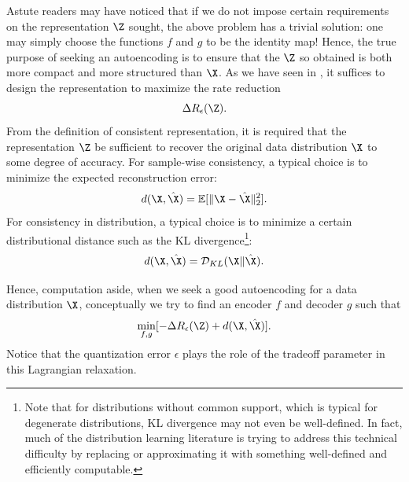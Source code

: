\documentclass[../../book-main.tex]{subfiles}
\begin{document}
Astute readers may have noticed that if we do not impose certain
requirements on the representation $\Z$ sought, the above problem has
a trivial solution: one may simply choose the functions $f$ and $g$
to be the identity map! Hence, the true purpose of seeking an
autoencoding is to ensure that the $\Z$ so obtained is both more
compact and more structured than $\X$.
As we have seen in ,
it suffices to design the representation to maximize the rate reduction
\begin{equation}
  \Delta R_{\epsilon}(\Z).
\end{equation}%
From the definition of consistent representation, it is required that
the representation $\Z$ be sufficient to recover the original data
distribution $\X$ to some degree of accuracy. For sample-wise
consistency, a typical choice is to minimize the expected reconstruction error:
\begin{equation}
  d(\X, \hat \X) = \mathbb{E}[\|\X - \hat\X\|_2^2].
\end{equation}
For consistency in distribution, a typical choice is to minimize a
certain distributional distance such as the KL
divergence\footnote{Note that for distributions without common
  support, which is typical for degenerate distributions, KL divergence
  may not even be well-defined. In fact, much of the distribution
  learning literature is trying to address this technical difficulty by
  replacing or approximating it with something well-defined and
efficiently computable.}:
\begin{equation}
  d(\X, \hat \X) = \mathcal{D}_{KL}(\X\|\hat\X).
\end{equation}

Hence, computation aside, when we seek a good autoencoding for a data
distribution $\X$, conceptually we try to find an encoder $f$ and
decoder $g$ such that
\begin{equation}
  \min_{f, g} [- \Delta R_{\epsilon}(\Z) + d(\X, \hat \X)].
  \label{eqn:autoencode-objective-ch5}
\end{equation}
Notice that the quantization error $\epsilon$ plays the role of the tradeoff
parameter in this Lagrangian relaxation.
\end{document}
